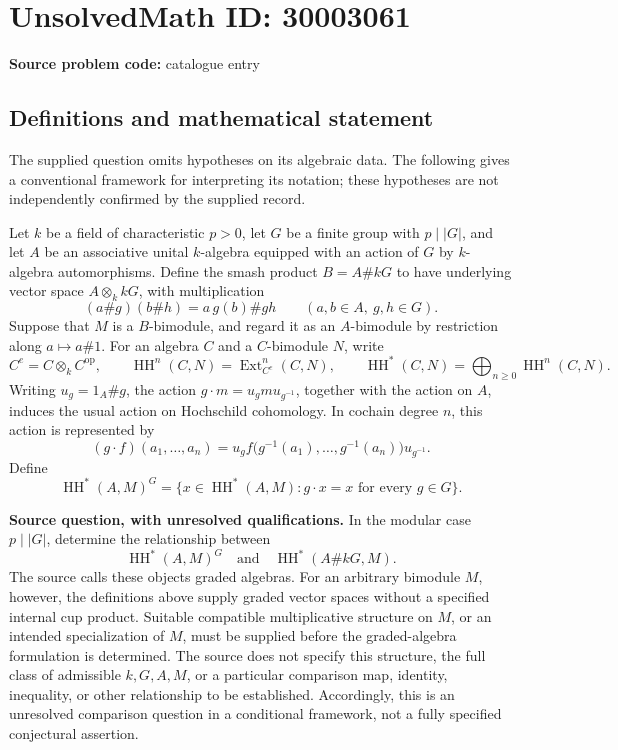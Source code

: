 \documentclass[11pt]{article}
\begin{document}
\section*{UnsolvedMath ID: 30003061}
\textbf{Source problem code:} catalogue entry
\subsection{Definitions and mathematical statement}
The supplied question omits hypotheses on its algebraic data. The following gives a conventional framework for interpreting its notation; these hypotheses are not independently confirmed by the supplied record.

Let \(k\) be a field of characteristic \(p>0\), let \(G\) be a finite group with \(p\mid |G|\), and let \(A\) be an associative unital \(k\)-algebra equipped with an action of \(G\) by \(k\)-algebra automorphisms. Define the smash product \(B=A\# kG\) to have underlying vector space \(A\otimes_k kG\), with multiplication
\[
(a\# g)(b\# h)=a\,g(b)\# gh
\qquad(a,b\in A,\ g,h\in G).
\]
Suppose that \(M\) is a \(B\)-bimodule, and regard it as an \(A\)-bimodule by restriction along \(a\mapsto a\#1\). For an algebra \(C\) and a \(C\)-bimodule \(N\), write
\[
C^e=C\otimes_k C^{\mathrm{op}},\qquad
\operatorname{HH}^n(C,N)=\operatorname{Ext}_{C^e}^n(C,N),\qquad
\operatorname{HH}^*(C,N)=\bigoplus_{n\geq0}\operatorname{HH}^n(C,N).
\]
Writing \(u_g=1_A\#g\), the action \(g\cdot m=u_g m u_{g^{-1}}\), together with the action on \(A\), induces the usual action on Hochschild cohomology. In cochain degree \(n\), this action is represented by
\[
(g\cdot f)(a_1,\ldots,a_n)
=u_g f\bigl(g^{-1}(a_1),\ldots,g^{-1}(a_n)\bigr)u_{g^{-1}}.
\]
Define
\[
\operatorname{HH}^*(A,M)^G
=\{x\in\operatorname{HH}^*(A,M):g\cdot x=x\text{ for every }g\in G\}.
\]

\textbf{Source question, with unresolved qualifications.} In the modular case \(p\mid |G|\), determine the relationship between
\[
\operatorname{HH}^*(A,M)^G
\quad\text{and}\quad
\operatorname{HH}^*(A\# kG,M).
\]
The source calls these objects graded algebras. For an arbitrary bimodule \(M\), however, the definitions above supply graded vector spaces without a specified internal cup product. Suitable compatible multiplicative structure on \(M\), or an intended specialization of \(M\), must be supplied before the graded-algebra formulation is determined. The source does not specify this structure, the full class of admissible \(k,G,A,M\), or a particular comparison map, identity, inequality, or other relationship to be established. Accordingly, this is an unresolved comparison question in a conditional framework, not a fully specified conjectural assertion.
\end{document}
